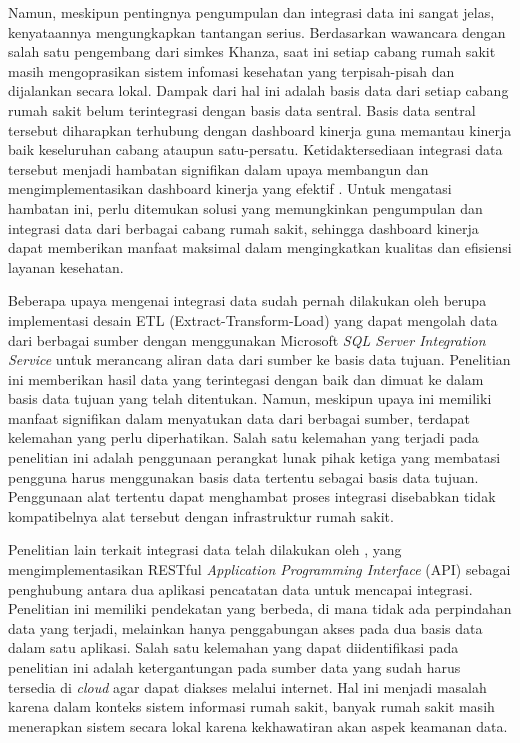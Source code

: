 Namun, meskipun pentingnya pengumpulan dan integrasi data ini sangat jelas, kenyataannya mengungkapkan tantangan serius. Berdasarkan wawancara dengan salah satu pengembang dari simkes Khanza, saat ini setiap cabang rumah sakit masih mengoprasikan sistem infomasi kesehatan yang terpisah-pisah dan dijalankan secara lokal. Dampak dari hal ini adalah basis data dari setiap cabang rumah sakit belum terintegrasi dengan basis data sentral. Basis data sentral tersebut diharapkan terhubung dengan dashboard kinerja guna memantau kinerja baik keseluruhan cabang ataupun satu-persatu. Ketidaktersediaan integrasi data tersebut menjadi hambatan signifikan dalam upaya membangun dan mengimplementasikan dashboard kinerja yang efektif \citet{Oliva2018}. Untuk mengatasi hambatan ini, perlu ditemukan solusi yang memungkinkan pengumpulan dan integrasi data dari berbagai cabang rumah sakit, sehingga dashboard kinerja dapat memberikan manfaat maksimal dalam mengingkatkan kualitas dan efisiensi layanan kesehatan.

Beberapa upaya mengenai integrasi data sudah pernah dilakukan oleh \citet{Firdaus2022MEMBANGUNID} berupa implementasi desain ETL (Extract-Transform-Load) yang dapat mengolah data dari berbagai sumber dengan menggunakan Microsoft \emph{SQL Server Integration Service} untuk merancang aliran data dari sumber ke basis data tujuan. Penelitian ini memberikan hasil data yang terintegasi dengan baik dan dimuat ke dalam basis data tujuan yang telah ditentukan. Namun, meskipun upaya ini memiliki manfaat signifikan dalam menyatukan data dari berbagai sumber, terdapat kelemahan yang perlu diperhatikan. Salah satu kelemahan yang terjadi pada penelitian ini adalah penggunaan perangkat lunak pihak ketiga yang membatasi pengguna harus menggunakan basis data tertentu sebagai basis data tujuan. Penggunaan alat tertentu dapat menghambat proses integrasi disebabkan tidak kompatibelnya alat tersebut dengan infrastruktur rumah sakit.

Penelitian lain terkait integrasi data telah dilakukan oleh \cite{Herfandi_Julkarnain_Hanif_2022}, yang mengimplementasikan RESTful \emph{Application Programming Interface} (API) sebagai penghubung antara dua aplikasi pencatatan data untuk mencapai integrasi. Penelitian ini memiliki pendekatan yang berbeda, di mana tidak ada perpindahan data yang terjadi, melainkan hanya penggabungan akses pada dua basis data dalam satu aplikasi. Salah satu kelemahan yang dapat diidentifikasi pada penelitian ini adalah ketergantungan pada sumber data yang sudah harus tersedia di \emph{cloud} agar dapat diakses melalui internet. Hal ini menjadi masalah karena dalam konteks sistem informasi rumah sakit, banyak rumah sakit masih menerapkan sistem secara lokal karena kekhawatiran akan aspek keamanan data. 


